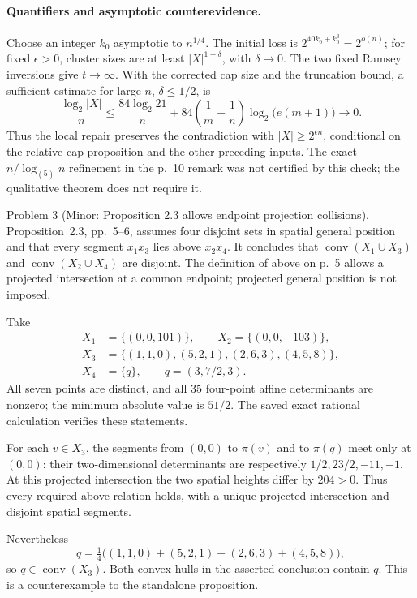 \documentclass[10pt]{article}
\begin{document}
\paragraph*{Quantifiers and asymptotic counterevidence.}\mbox{}\par
Choose an integer \(k_0\) asymptotic to \(n^{1/4}\). The initial loss is \(2^{40k_0+k_0^3}=2^{o(n)}\); for fixed \(\epsilon>0\), cluster sizes are at least \(|X|^{1-\delta}\), with \(\delta\to0\). The two fixed Ramsey inversions give \(t\to\infty\). With the corrected cap size and the truncation bound, a sufficient estimate for large \(n\), \(\delta\le1/2\), is \[\frac{\log_2|X|}{n}
 \le
 \frac{84\log_2 21}{n}+
 84\left(\frac1m+\frac1n\right)
 \log_2\!\bigl(e(m+1)\bigr)
 \longrightarrow0.\] Thus the local repair preserves the contradiction with \(|X|\ge2^{\epsilon n}\), conditional on the relative-cap proposition and the other preceding inputs. The exact \(n/\log_{(5)}n\) refinement in the p. 10 remark was not certified by this check; the qualitative theorem does not require it.\par
Problem 3 (Minor: Proposition 2.3 allows endpoint projection collisions).  Proposition 2.3, pp. 5–6, assumes four disjoint sets in spatial general position and that every segment \(x_1x_3\) lies above \(x_2x_4\). It concludes that \(\operatorname{conv}(X_1\cup X_3)\) and \(\operatorname{conv}(X_2\cup X_4)\) are disjoint. The definition of above on p. 5 allows a projected intersection at a common endpoint; projected general position is not imposed.\par
Take \[\begin{split}
 X_1&=\{(0,0,101)\},\qquad X_2=\{(0,0,-103)\},\\
 X_3&=\{(1,1,0),(5,2,1),(2,6,3),(4,5,8)\},\\
 X_4&=\{q\},\qquad q=(3,7/2,3).
\end{split}\] All seven points are distinct, and all \(35\) four-point affine determinants are nonzero; the minimum absolute value is \(51/2\). The saved exact rational calculation verifies these statements.\par
For each \(v\in X_3\), the segments from \((0,0)\) to \(\pi(v)\) and to \(\pi(q)\) meet only at \((0,0)\): their two-dimensional determinants are respectively \(1/2,23/2,-11,-1\). At this projected intersection the two spatial heights differ by \(204>0\). Thus every required above relation holds, with a unique projected intersection and disjoint spatial segments.\par
Nevertheless \[q=\tfrac14\bigl((1,1,0)+(5,2,1)+(2,6,3)+(4,5,8)\bigr),\] so \(q\in\operatorname{conv}(X_3)\). Both convex hulls in the asserted conclusion contain \(q\). This is a counterexample to the standalone proposition.\par
\end{document}
